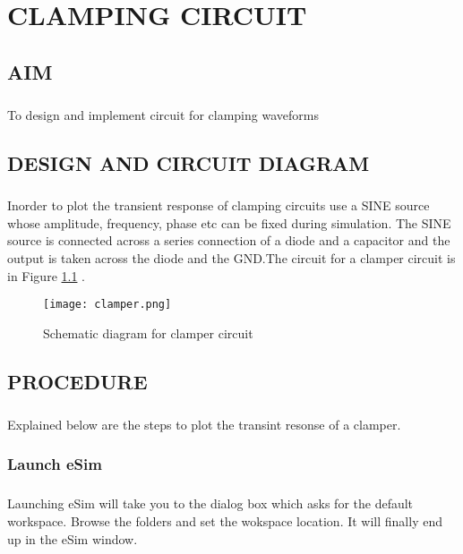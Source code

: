 \chapter{CLAMPING CIRCUIT}

\section*{AIM}
\paragraph{}To design and implement circuit for clamping waveforms
\section*{DESIGN AND CIRCUIT DIAGRAM}
\paragraph{}

Inorder to plot the transient response of clamping circuits use a SINE source whose amplitude, frequency, phase etc can be fixed during simulation. The SINE source is connected across a series connection of a diode and a capacitor and the output is taken across  the diode and the GND.The circuit for a clamper circuit is in Figure  \ref{clamper} .

\begin{figure}[h]
\centering
\texttt{[image: clamper.png]}
\caption{Schematic diagram for clamper circuit}
\label{clamper}
\end{figure}


\section*{PROCEDURE}

\paragraph{}Explained below are the steps to plot the transint resonse of a clamper. 
\subsection*{Launch eSim}

\paragraph{}
 Launching eSim will take you to the dialog box which asks for the default workspace. Browse the folders and set the wokspace location. It will finally end up in the eSim window.%

